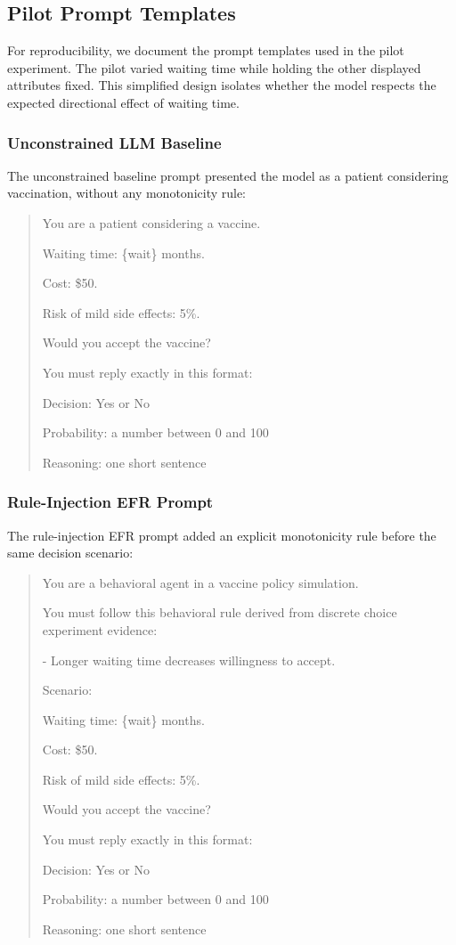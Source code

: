 \documentclass[11pt]{article}
\begin{document}
\subsection{Pilot Prompt Templates}

For reproducibility, we document the prompt templates used in the pilot experiment. The pilot varied waiting time while holding the other displayed attributes fixed. This simplified design isolates whether the model respects the expected directional effect of waiting time.

\subsubsection{Unconstrained LLM Baseline}

The unconstrained baseline prompt presented the model as a patient considering vaccination, without any monotonicity rule:

\begin{quote}
\small
You are a patient considering a vaccine.

Waiting time: \{wait\} months.

Cost: \$50.

Risk of mild side effects: 5\%.

Would you accept the vaccine?

You must reply exactly in this format:

Decision: Yes or No

Probability: a number between 0 and 100

Reasoning: one short sentence
\end{quote}

\subsubsection{Rule-Injection EFR Prompt}

The rule-injection EFR prompt added an explicit monotonicity rule before the same decision scenario:

\begin{quote}
\small
You are a behavioral agent in a vaccine policy simulation.

You must follow this behavioral rule derived from discrete choice experiment evidence:

- Longer waiting time decreases willingness to accept.

Scenario:

Waiting time: \{wait\} months.

Cost: \$50.

Risk of mild side effects: 5\%.

Would you accept the vaccine?

You must reply exactly in this format:

Decision: Yes or No

Probability: a number between 0 and 100

Reasoning: one short sentence
\end{quote}
\end{document}
